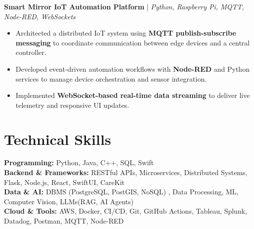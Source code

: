 \documentclass[letterpaper,11pt]{article}
\begin{document}
\textbf{Smart Mirror IoT Automation Platform} \;|\; \textit{Python, Raspberry Pi, MQTT, Node-RED, WebSockets} \\
\begin{itemize}[noitemsep]
    \item Architected a distributed IoT system using \textbf{MQTT publish-subscribe messaging} to coordinate communication between edge devices and a central controller.
    \item Developed event-driven automation workflows with \textbf{Node-RED} and Python services to manage device orchestration and sensor integration.
    \item Implemented \textbf{WebSocket-based real-time data streaming} to deliver live telemetry and responsive UI updates.
\end{itemize}

\section*{Technical Skills}

\textbf{Programming:} Python, Java, C++, SQL, Swift \\

\textbf{Backend \& Frameworks:} RESTful APIs, Microservices, Distributed Systems, Flask, Node.js, React, SwiftUI, CareKit \\

\textbf{Data \& AI:} DBMS (PostgreSQL, PostGIS, NoSQL) , Data Processing, ML, Computer Vision, LLMs(RAG, AI Agents) \\

\textbf{Cloud \& Tools:} AWS, Docker, CI/CD, Git, GitHub Actions, Tableau, Splunk, Datadog, Postman, MQTT, Node-RED
\end{document}
